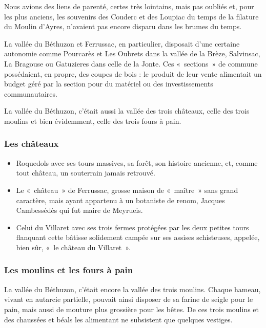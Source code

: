 Nous avions des liens de parenté, certes très lointains, mais pas oubliés et, pour les plus anciens, les
souvenirs des Couderc et des Loupiac du temps de la filature du Moulin d’Ayres, n’avaient pas encore
disparu dans les brumes du temps.

La vallée du Béthuzon et Ferrussac, en particulier, disposait d’une certaine autonomie comme
Pourcarès et Les Oubrets dans la vallée de la Brèze, Salvinsac, La Bragouse ou Gatuzieres dans celle
de la Jonte. Ces «~sections~» de commune possédaient, en propre, des coupes de bois : le produit de
leur vente alimentait un budget géré par la section pour du matériel ou des investissements
communautaires.

La vallée du Béthuzon, c’était aussi la vallée des trois châteaux, celle des trois moulins et bien
évidemment, celle des trois fours à pain.

\subsubsection{Les châteaux}

\begin{itemize}
\item Roquedols avec ses tours massives, sa forêt, son histoire ancienne, et, comme tout château, un
souterrain jamais retrouvé.
\item Le «~château~» de Ferrussac, grosse maison de «~maître~» sans grand caractère, mais ayant appartenu à un botaniste de renom, Jacques Cambessédès qui fut maire de Meyrueis.
\item Celui du Villaret avec ses trois fermes protégées par les deux petites tours flanquant cette bâtisse solidement campée sur ses assises schisteuses, appelée, bien sûr, «~le château du Villaret~».
\end{itemize}

\subsubsection{Les moulins et les fours à pain}

La vallée du Béthuzon, c’était encore la vallée des trois moulins. Chaque hameau, vivant en autarcie
partielle, pouvait ainsi disposer de sa farine de seigle pour le pain, mais aussi de mouture plus
grossière pour les bêtes. De ces trois moulins et des chaussées et béals les alimentant ne subsistent que
quelques vestiges.

